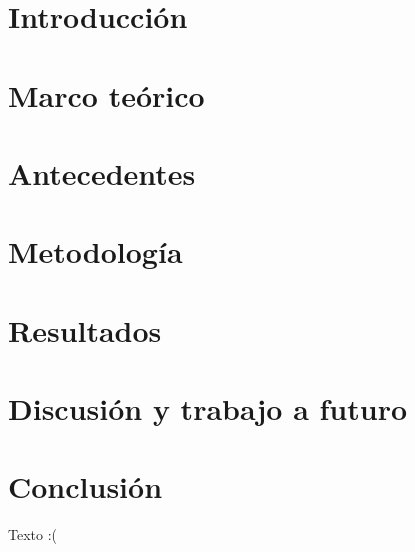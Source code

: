 \documentclass[12pt,letterpaper]{report}
\begin{document}


\tableofcontents
\newpage
\listoffigures

%
%


\newpage
{}

\chapter{Introducción}


\chapter{Marco teórico}


\chapter{Antecedentes}


\chapter{Metodología}


\chapter{Resultados}


\chapter{Discusión y trabajo a futuro}


\chapter{Conclusión}
Texto :(

\renewcommand{\bibname}{Referencias}


\end{document}
